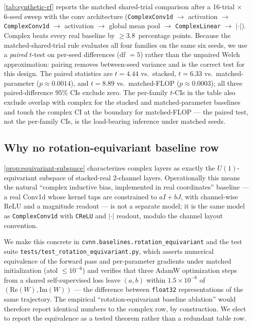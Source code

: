 \documentclass{article}
\providecommand{\Cref}[1]{\autoref{#1}}
\newcommand{\code}[1]{\texttt{#1}}
\begin{document}
\Cref{tab:synthetic-rf} reports the matched shared-trial comparison
after a 16-trial $\times$ 6-seed sweep with the conv architecture
(\code{ComplexConv1d} $\to$ activation $\to$ \code{ComplexConv1d} $\to$
activation $\to$ global mean pool $\to$ \code{ComplexLinear} $\to$
$|\cdot|$). Complex beats every real baseline by $\geq$3.8~percentage
points. Because the matched-shared-trial rule evaluates all four
families on the same six seeds, we use a \emph{paired} $t$-test on
per-seed differences (df $=5$) rather than the unpaired Welch
approximation: pairing removes between-seed variance and is the
correct test for this design. The paired statistics are
$t = 4.44$ vs.\ stacked, $t = 6.33$ vs.\ matched-parameter
($p \approx 0.0014$), and $t = 8.89$ vs.\ matched-FLOP
($p \approx 0.0003$); all three paired-difference $95\%$ CIs exclude
zero. The per-family $t$-CIs in the table also exclude overlap with
complex for the stacked and matched-parameter baselines and touch
the complex CI at the boundary for matched-FLOP --- the paired test,
not the per-family CIs, is the load-bearing inference under matched
seeds.

\subsection{Why no rotation-equivariant baseline row}
\label{sec:rotation-equivariant-control}

\Cref{prop:equivariant-subspace} characterizes complex layers as
exactly the $U(1)$-equivariant subspace of stacked-real $2$-channel
layers. Operationally this means the natural ``complex inductive bias,
implemented in real coordinates'' baseline --- a real Conv1d whose
kernel taps are constrained to $aI + bJ$, with channel-wise ReLU and a
magnitude readout --- is not a separate model; it is the same model as
\code{ComplexConv1d} with \code{CReLU} and $|\cdot|$ readout, modulo
the channel layout convention.

We make this concrete in \code{cvnn.baselines.rotation\_equivariant}
and the test suite \code{tests/test\_rotation\_equivariant.py}, which
asserts numerical equivalence of the forward pass and per-parameter
gradients under matched initialization (atol \mbox{$\leq 10^{-6}$})
and verifies that three AdamW optimization steps from a shared
self-supervised loss leave $(a, b)$ within $1.5 \times 10^{-8}$ of
$(\mathrm{Re}(W), \mathrm{Im}(W))$ --- the difference between
\code{float32} representations of the same trajectory. The empirical
``rotation-equivariant baseline ablation'' would therefore report
identical numbers to the complex row, by construction. We elect to
report the equivalence as a tested theorem rather than a redundant
table row.
\end{document}

